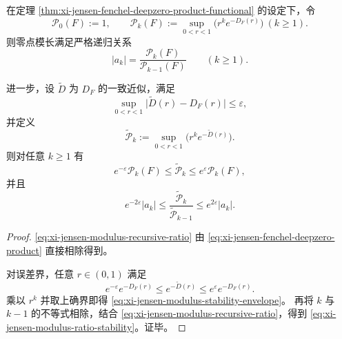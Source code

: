 \begin{corollary}[零点模长谱的递归可观测性与误差传播界]\label{cor:xi-jensen-modulus-recursive-observability-stability}
在定理 \ref{thm:xi-jensen-fenchel-deepzero-product-functional} 的设定下，令
\[
\mathcal P_0(F):=1,\qquad
\mathcal P_k(F):=\sup_{0<r<1}\bigl(r^k e^{-D_F(r)}\bigr)\ (k\ge 1).
\]
则零点模长满足严格递归关系
\begin{equation}\label{eq:xi-jensen-modulus-recursive-ratio}
\boxed{\;
|a_k|=\frac{\mathcal P_k(F)}{\mathcal P_{k-1}(F)}\qquad(k\ge 1).\;}
\end{equation}

进一步，设 \(\widetilde D\) 为 \(D_F\) 的一致近似，满足
\[
\sup_{0<r<1}\bigl|\widetilde D(r)-D_F(r)\bigr|\le \varepsilon,
\]
并定义
\[
\widetilde{\mathcal P}_k:=\sup_{0<r<1}\bigl(r^k e^{-\widetilde D(r)}\bigr).
\]
则对任意 \(k\ge 1\) 有
\begin{equation}\label{eq:xi-jensen-modulus-stability-envelope}
e^{-\varepsilon}\mathcal P_k(F)\le \widetilde{\mathcal P}_k\le e^{\varepsilon}\mathcal P_k(F),
\end{equation}
并且
\begin{equation}\label{eq:xi-jensen-modulus-ratio-stability}
\boxed{\;
e^{-2\varepsilon}|a_k|
\le
\frac{\widetilde{\mathcal P}_k}{\widetilde{\mathcal P}_{k-1}}
\le
e^{2\varepsilon}|a_k|.\;}
\end{equation}
\end{corollary}
\begin{proof}
\eqref{eq:xi-jensen-modulus-recursive-ratio}
由 \eqref{eq:xi-jensen-fenchel-deepzero-product} 直接相除得到。

对误差界，任意 \(r\in(0,1)\) 满足
\[
e^{-\varepsilon}e^{-D_F(r)}
\le e^{-\widetilde D(r)}
\le e^{\varepsilon}e^{-D_F(r)}.
\]
乘以 \(r^k\) 并取上确界即得
\eqref{eq:xi-jensen-modulus-stability-envelope}。
再将 \(k\) 与 \(k-1\) 的不等式相除，结合
\eqref{eq:xi-jensen-modulus-recursive-ratio}，得到
\eqref{eq:xi-jensen-modulus-ratio-stability}。证毕。
\end{proof}

